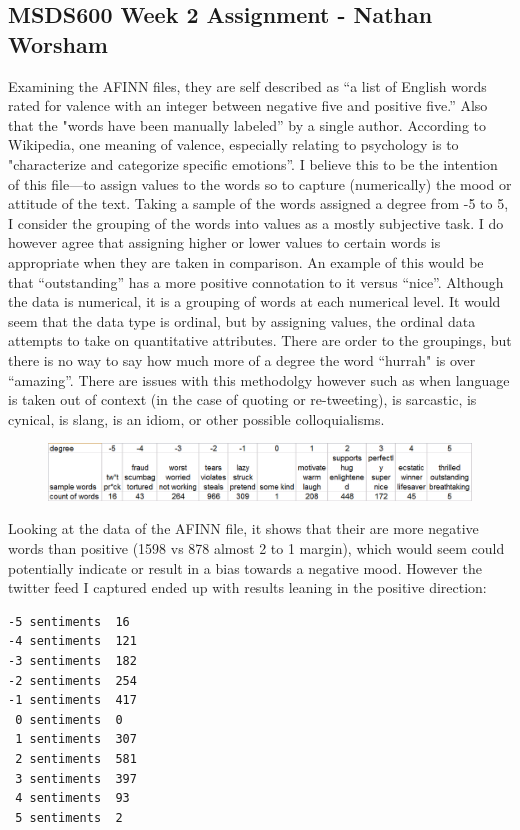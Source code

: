\documentclass[10pt]{article}
\begin{document}
\subsection*{MSDS600 Week 2 Assignment - Nathan Worsham}
Examining the AFINN files, they are self described as “a list of English words rated for valence with an integer between negative five and positive five.” Also that the "words have 
been manually labeled” by a single author. According to Wikipedia, one meaning of valence, especially relating to psychology is to "characterize and categorize specific emotions”. I believe this to be the intention of this file—to assign values to the words so to capture (numerically) the mood or attitude of the text. Taking a sample of the words assigned a degree from -5 to 5, I consider the grouping of the words into values as a mostly subjective task. I do however agree that assigning higher or lower values to certain words is appropriate when they are taken in comparison. An example of this would be that “outstanding” has a more positive connotation to it versus “nice”. Although the data is numerical, it is a grouping of words at each numerical level. It would seem that the data type is ordinal, but by assigning values, the ordinal data attempts to take on quantitative attributes. There are order to the groupings, but there is no way to say how much more of a degree the word “hurrah" is over “amazing”. There are issues with this methodolgy however such as when language is taken out of context (in the case of quoting or re-tweeting), is sarcastic, is cynical, is slang, is an idiom, or other possible colloquialisms. \\ 

\begin{figure}[!h]
\includegraphics[scale=0.37]{table1.png}
\centering
\end{figure}

Looking at the data of the AFINN file, it shows that their are more negative words than positive (1598 vs 878 almost 2 to 1 margin), which would seem could potentially indicate or result in a bias towards a negative mood. However the twitter feed I captured ended up with results leaning in the positive direction: 
\begin{verbatim}
-5 sentiments  16 
-4 sentiments  121 
-3 sentiments  182 
-2 sentiments  254 
-1 sentiments  417 
 0 sentiments  0 
 1 sentiments  307 
 2 sentiments  581 
 3 sentiments  397 
 4 sentiments  93 
 5 sentiments  2 
\end{verbatim}
\end{document}
